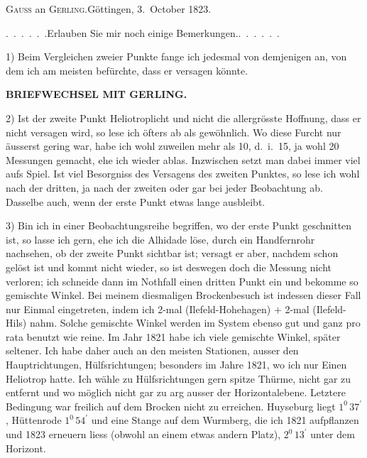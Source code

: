 \begin{center}
\textsc{Gauss} an \textsc{Gerling}.\quad Göttingen, 3.~October 1823.
\end{center}

\par\noindent\hspace*{\parindent}\mbox{.\ .\ .\ .\ .\ .}\quad Erlauben Sie mir noch einige \mbox{Bemerkungen.\quad\mbox{.\ .\ .\ .\ .\ .}}
\par\noindent\hspace*{\parindent}1) Beim Vergleichen zweier Punkte fange ich jedesmal von demjenigen
an, von dem ich am meisten befürchte, dass er versagen könnte.
\par\clearpage
\noindent{}\hfill{\small\textbf{BRIEFWECHSEL MIT GERLING.}}\hfill\null\par\medskip
\par\noindent\hspace*{\parindent}2) Ist der zweite Punkt Heliotroplicht und nicht die allergrösste Hoffnung,
dass er nicht versagen wird, so lese ich öfters ab als gewöhnlich. Wo diese
Furcht nur äusserst gering war, habe ich wohl zuweilen mehr als 10, d.~i.\ 15,
ja wohl 20 Messungen gemacht, ehe ich wieder ablas. Inzwischen setzt man
dabei immer viel aufs Spiel. Ist viel Besorgniss des Versagens des zweiten
Punktes, so lese ich wohl nach der dritten, ja nach der zweiten oder gar bei
jeder Beobachtung ab. Dasselbe auch, wenn der erste Punkt etwas lange
ausbleibt.
\par\noindent\hspace*{\parindent}3) Bin ich in einer Beobachtungsreihe begriffen, wo der erste Punkt
geschnitten ist, so lasse ich gern, ehe ich die Alhidade löse, durch ein
Handfernrohr nachsehen, ob der zweite Punkt sichtbar ist; versagt er aber,
nachdem schon gelöst ist und kommt nicht wieder, so ist deswegen doch die
Messung nicht verloren; ich schneide dann im Nothfall einen dritten Punkt ein
und bekomme so gemischte Winkel. Bei meinem diesmaligen Brockenbesuch
ist indessen dieser Fall nur Einmal eingetreten, indem ich 2-mal
(Ilefeld-Hohehagen) \(+\) 2-mal (Ilefeld-Hils) nahm. Solche gemischte Winkel werden im
System ebenso gut und ganz pro rata benutzt wie reine. Im Jahr 1821 habe
ich viele gemischte Winkel, später seltener. Ich habe daher auch an den
meisten Stationen, ausser den Hauptrichtungen, Hülfsrichtungen; besonders im
Jahre 1821, wo ich nur Einen Heliotrop hatte. Ich wähle zu Hülfsrichtungen
gern spitze Thürme, nicht gar zu entfernt und wo möglich nicht gar zu arg
ausser der Horizontalebene. Letztere Bedingung war freilich auf dem Brocken
nicht zu erreichen. Huyseburg liegt \(1^{0}\,37^{\prime}\), Hüttenrode \(1^{0}\,54^{\prime}\) und eine Stange
auf dem Wurmberg, die ich 1821 aufpflanzen und 1823 erneuern liess
(obwohl an einem etwas andern Platz), \(2^{0}\,13^{\prime}\) unter dem Horizont.
\par
